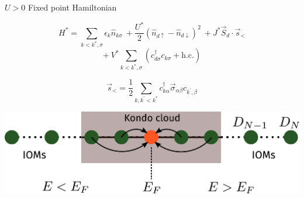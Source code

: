 \documentclass[aspectratio=169]{beamer}
\begin{document}
\begin{frame}[noframenumbering]{\(U > 0\) Fixed point Hamiltonian}
\begin{minipage}{0.48\textwidth}
	\[H^* = \sum_{k < k^*,\sigma}\epsilon_{k}\hat{n}_{k\sigma} ~ + \frac{U^*}{2}\left(\hat n_{d \uparrow} - \hat n_{d \downarrow}\right)^2 ~ + J^* \vec{S}_d\cdot \vec{s}_<\]
	\[+ ~ V^* \sum_{k < k^*,\sigma}\left(c^\dagger_{d\sigma}c_{k\sigma} + \text{h.c.}\right)\]

	\vspace*{20pt}
	\[\vec{s}_< = \frac{1}{2}\sum_{k,k^\prime < k^*}c^{\dagger}_{k\alpha}\vec{\sigma}_{\alpha\beta}c_{k^\prime,\beta}\]
\end{minipage}
\begin{minipage}{0.5\textwidth}
	\includegraphics[width=\textwidth]{figures/kondo_fp_1D.pdf}
\end{minipage}
\end{frame}
\end{document}
